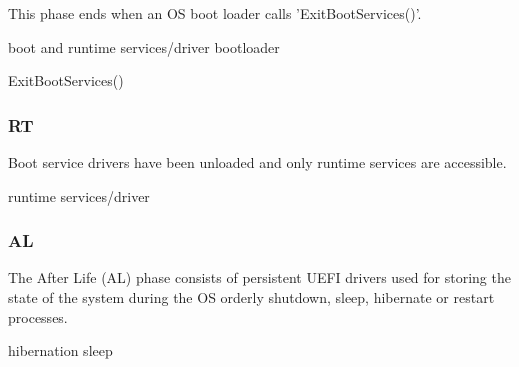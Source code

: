 This phase ends when an OS boot loader calls 'ExitBootServices()'.

boot and runtime services/driver
bootloader
\cite[Section 13.3]{uefi-spec}
\cite[Section 3.5.1.1]{uefi-spec}

ExitBootServices()

\subsubsection{\acf{RT}}


Boot service drivers have been unloaded and only runtime services are accessible.


runtime services/driver

\subsubsection{\acf{AL}}


The After Life (AL) phase consists of persistent UEFI drivers used for storing the state of the system during the OS orderly shutdown, sleep, hibernate or restart processes.

hibernation
sleep


